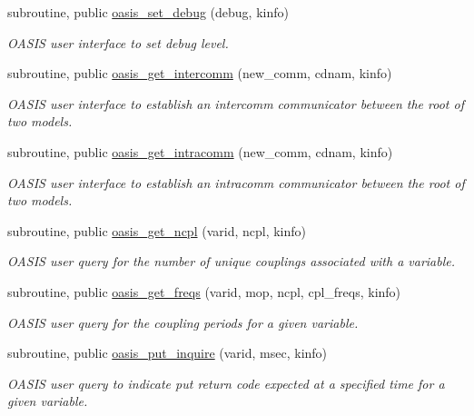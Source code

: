 \begin{DoxyCompactItemize}
subroutine, public \hyperlink{classmod__oasis__auxiliary__routines_a71bf70a87b2d4ce86016bbb93d9edd73}{oasis\+\_\+set\+\_\+debug} (debug, kinfo)
\begin{DoxyCompactList}\small\item\em O\+A\+S\+I\+S user interface to set debug level. \end{DoxyCompactList}\item 
subroutine, public \hyperlink{classmod__oasis__auxiliary__routines_a589021c0f1427f8e5edb1c7efcd7fa2c}{oasis\+\_\+get\+\_\+intercomm} (new\+\_\+comm, cdnam, kinfo)
\begin{DoxyCompactList}\small\item\em O\+A\+S\+I\+S user interface to establish an intercomm communicator between the root of two models. \end{DoxyCompactList}\item 
subroutine, public \hyperlink{classmod__oasis__auxiliary__routines_aa1959db40e8c27dea289b97458929526}{oasis\+\_\+get\+\_\+intracomm} (new\+\_\+comm, cdnam, kinfo)
\begin{DoxyCompactList}\small\item\em O\+A\+S\+I\+S user interface to establish an intracomm communicator between the root of two models. \end{DoxyCompactList}\item 
subroutine, public \hyperlink{classmod__oasis__auxiliary__routines_a154d3345ef9691e378afdc871086f7eb}{oasis\+\_\+get\+\_\+ncpl} (varid, ncpl, kinfo)
\begin{DoxyCompactList}\small\item\em O\+A\+S\+I\+S user query for the number of unique couplings associated with a variable. \end{DoxyCompactList}\item 
subroutine, public \hyperlink{classmod__oasis__auxiliary__routines_a62d1c98c05bcc4bd5e8796866bcce2db}{oasis\+\_\+get\+\_\+freqs} (varid, mop, ncpl, cpl\+\_\+freqs, kinfo)
\begin{DoxyCompactList}\small\item\em O\+A\+S\+I\+S user query for the coupling periods for a given variable. \end{DoxyCompactList}\item 
subroutine, public \hyperlink{classmod__oasis__auxiliary__routines_a7a95eb579171b6c2f06ff532c7823e2e}{oasis\+\_\+put\+\_\+inquire} (varid, msec, kinfo)
\begin{DoxyCompactList}\small\item\em O\+A\+S\+I\+S user query to indicate put return code expected at a specified time for a given variable. \end{DoxyCompactList}\end{DoxyCompactItemize}
